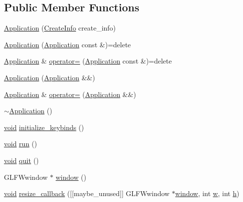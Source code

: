 \subsection*{Public Member Functions}
\begin{DoxyCompactItemize}
\item 
\mbox{\hyperlink{class_saturn_1_1_application_aaafa436d6d0bece4451d49f401b338f1}{Application}} (\mbox{\hyperlink{struct_saturn_1_1_application_1_1_create_info}{Create\+Info}} create\+\_\+info)
\item 
\mbox{\hyperlink{class_saturn_1_1_application_ae7d9f4ccbae7382d9ae4fc74763b142d}{Application}} (\mbox{\hyperlink{class_saturn_1_1_application}{Application}} const \&)=delete
\item 
\mbox{\hyperlink{class_saturn_1_1_application}{Application}} \& \mbox{\hyperlink{class_saturn_1_1_application_af2bf9969a59d0184c05d2463a1a58ecd}{operator=}} (\mbox{\hyperlink{class_saturn_1_1_application}{Application}} const \&)=delete
\item 
\mbox{\hyperlink{class_saturn_1_1_application_ae6744197965b61f7f48f3818cd0ac5c7}{Application}} (\mbox{\hyperlink{class_saturn_1_1_application}{Application}} \&\&)
\item 
\mbox{\hyperlink{class_saturn_1_1_application}{Application}} \& \mbox{\hyperlink{class_saturn_1_1_application_a1b57eca790c1ed09f09375a66eb14fa4}{operator=}} (\mbox{\hyperlink{class_saturn_1_1_application}{Application}} \&\&)
\item 
\mbox{\hyperlink{class_saturn_1_1_application_afde2666c105cef20fbb853f579cf71ac}{$\sim$\+Application}} ()
\item 
\mbox{\hyperlink{glad_8h_a950fc91edb4504f62f1c577bf4727c29}{void}} \mbox{\hyperlink{class_saturn_1_1_application_a5b4afe5346378892480c1e2df65190a1}{initialize\+\_\+keybinds}} ()
\item 
\mbox{\hyperlink{glad_8h_a950fc91edb4504f62f1c577bf4727c29}{void}} \mbox{\hyperlink{class_saturn_1_1_application_acc0350b28c588e9156c34226035a7314}{run}} ()
\item 
\mbox{\hyperlink{glad_8h_a950fc91edb4504f62f1c577bf4727c29}{void}} \mbox{\hyperlink{class_saturn_1_1_application_afb4a680c55f5e8b13412cdd87a6d0b37}{quit}} ()
\item 
G\+L\+F\+Wwindow $\ast$ \mbox{\hyperlink{class_saturn_1_1_application_a0a819480dfc0fa3765415a943f987c4b}{window}} ()
\item 
\mbox{\hyperlink{glad_8h_a950fc91edb4504f62f1c577bf4727c29}{void}} \mbox{\hyperlink{class_saturn_1_1_application_a966c704c1afececffd75c3333df89be9}{resize\+\_\+callback}} (\mbox{[}\mbox{[}maybe\+\_\+unused\mbox{]}\mbox{]} G\+L\+F\+Wwindow $\ast$\mbox{\hyperlink{class_saturn_1_1_application_a0a819480dfc0fa3765415a943f987c4b}{window}}, int \mbox{\hyperlink{glad_8h_afb1b07e1b25035d41d60fb2c03d507e6}{w}}, int \mbox{\hyperlink{glad_8h_afa0fb1b5e976920c0abeff2dca3ed774}{h}})
\end{DoxyCompactItemize}
